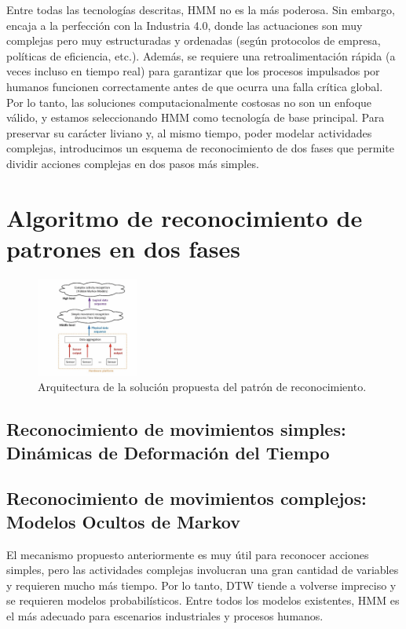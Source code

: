 \documentclass{article}
\begin{document}
Entre todas las tecnologías descritas, HMM no es la más poderosa. Sin embargo, encaja a la perfección con la Industria 4.0, donde las actuaciones son muy complejas pero muy estructuradas y ordenadas (según protocolos de empresa, políticas de eficiencia, etc.). Además, se requiere una retroalimentación rápida (a veces incluso en tiempo real) para garantizar que los procesos impulsados por humanos funcionen correctamente antes de que ocurra una falla crítica global. Por lo tanto, las soluciones computacionalmente costosas no son un enfoque válido, y estamos seleccionando HMM como tecnología de base principal. Para preservar su carácter liviano y, al mismo tiempo, poder modelar actividades complejas, introducimos un esquema de reconocimiento de dos fases que permite dividir acciones complejas en dos pasos más simples.
\section {Algoritmo de reconocimiento de patrones en dos fases}


\begin{figure}
\centering
\includegraphics[width=0.3\textwidth]{punto3.png}
\caption{\label{fig:frog}Arquitectura de la solución propuesta del patrón de reconocimiento.}
\end{figure}
\subsection{Reconocimiento de movimientos simples: Dinámicas de Deformación del Tiempo}
\subsection{Reconocimiento de movimientos complejos: Modelos Ocultos de Markov}

El mecanismo propuesto anteriormente es muy útil para reconocer acciones simples, pero
las actividades complejas involucran una gran cantidad de variables y requieren mucho más tiempo.
Por lo tanto, DTW tiende a volverse impreciso y se requieren modelos probabilísticos. Entre
todos los modelos existentes, HMM es el más adecuado para escenarios industriales y procesos humanos.
\end{document}
